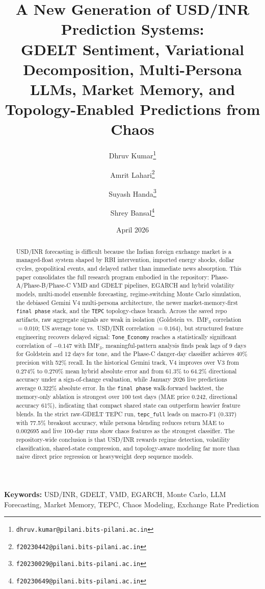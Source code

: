 \documentclass[11pt,a4paper]{article}
\title{A New Generation of USD/INR Prediction Systems:\\
GDELT Sentiment, Variational Decomposition, Multi-Persona LLMs, Market Memory, and Topology-Enabled Predictions from Chaos}
\author{
    Dhruv Kumar\thanks{\texttt{dhruv.kumar@pilani.bits-pilani.ac.in}} \and
    Amrit Lahari\thanks{\texttt{f20230442@pilani.bits-pilani.ac.in}} \and
    Suyash Handa\thanks{\texttt{f20230029@pilani.bits-pilani.ac.in}} \and
    Shrey Bansal\thanks{\texttt{f20230649@pilani.bits-pilani.ac.in}}
}
\date{April 2026}
\begin{document}
\maketitle

\begin{abstract}
USD/INR forecasting is difficult because the Indian foreign exchange market is a managed-float system shaped by RBI intervention, imported energy shocks, dollar cycles, geopolitical events, and delayed rather than immediate news absorption. This paper consolidates the full research program embodied in the repository: Phase-A/Phase-B/Phase-C VMD and GDELT pipelines, EGARCH and hybrid volatility models, multi-model ensemble forecasting, regime-switching Monte Carlo simulation, the debiased Gemini V4 multi-persona architecture, the newer market-memory-first \texttt{final phase} stack, and the \texttt{TEPC} topology-chaos branch. Across the saved repo artifacts, raw aggregate signals are weak in isolation (Goldstein vs.\ IMF$_3$ correlation $= 0.010$; US average tone vs.\ USD/INR correlation $= 0.164$), but structured feature engineering recovers delayed signal: \texttt{Tone\_Economy} reaches a statistically significant correlation of $-0.147$ with IMF$_3$, meaningful-pattern analysis finds peak lags of 9 days for Goldstein and 12 days for tone, and the Phase-C danger-day classifier achieves 40\% precision with 52\% recall. In the historical Gemini track, V4 improves over V3 from 0.274\% to 0.270\% mean hybrid absolute error and from 61.3\% to 64.2\% directional accuracy under a sign-of-change evaluation, while January 2026 live predictions average 0.322\% absolute error. In the \texttt{final phase} walk-forward backtest, the memory-only ablation is strongest over 100 test days (MAE price 0.242, directional accuracy 61\%), indicating that compact shared state can outperform heavier feature blends. In the strict raw-GDELT TEPC run, \texttt{tepc\_full} leads on macro-F1 (0.337) with 77.5\% breakout accuracy, while persona blending reduces return MAE to 0.002695 and live 100-day runs show chaos features as the strongest classifier. The repository-wide conclusion is that USD/INR rewards regime detection, volatility classification, shared-state compression, and topology-aware modeling far more than naive direct price regression or heavyweight deep sequence models.
\end{abstract}

\textbf{Keywords:} USD/INR, GDELT, VMD, EGARCH, Monte Carlo, LLM Forecasting, Market Memory, TEPC, Chaos Modeling, Exchange Rate Prediction
\end{document}
